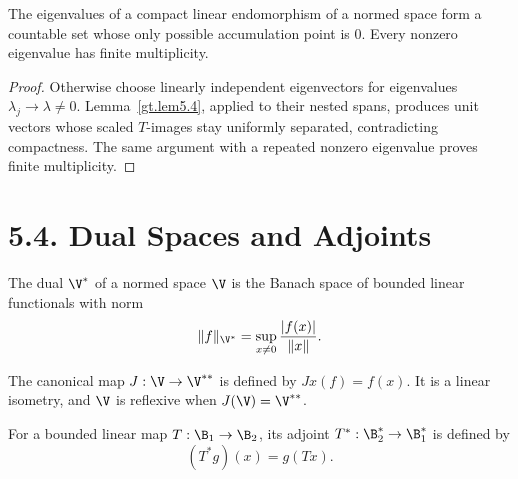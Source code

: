 \begin{theorem}\label{gt.thm5.5}
The eigenvalues of a compact linear endomorphism of a normed space form a
countable set whose only possible accumulation point is $0$. Every nonzero
eigenvalue has finite multiplicity.
\end{theorem}
\begin{proof}
\sketch Otherwise choose linearly independent eigenvectors for eigenvalues
$\lambda_j\to\lambda\neq0$. Lemma~\ref{gt.lem5.4}, applied to their nested
spans, produces unit vectors whose scaled $T$-images stay uniformly
separated, contradicting compactness. The same argument with a repeated
nonzero eigenvalue proves finite multiplicity.
\end{proof}

\section*{5.4. Dual Spaces and Adjoints}

\begin{definition}\label{gt.def5.4.dual-space}
The dual $\V^*$ of a normed space $\V$ is the Banach space of bounded linear
functionals with norm
\begin{equation}\label{gt.eq5.5}
\|f\|_{\V^*}=\sup_{x\neq0}\frac{|f(x)|}{\|x\|}.
\end{equation}
\end{definition}

\begin{definition}\label{gt.def5.4.reflexive}
The canonical map $J:\V\to\V^{**}$ is defined by $Jx(f)=f(x)$. It is a
linear isometry, and $\V$ is reflexive when $J(\V)=\V^{**}$.
\end{definition}

\begin{definition}\label{gt.def5.4.adjoint}
For a bounded linear map $T:\B_1\to\B_2$, its adjoint
$T^*:\B_2^*\to\B_1^*$ is defined by
\begin{equation}\label{gt.eq5.6}
(T^*g)(x)=g(Tx).
\end{equation}
\end{definition}

